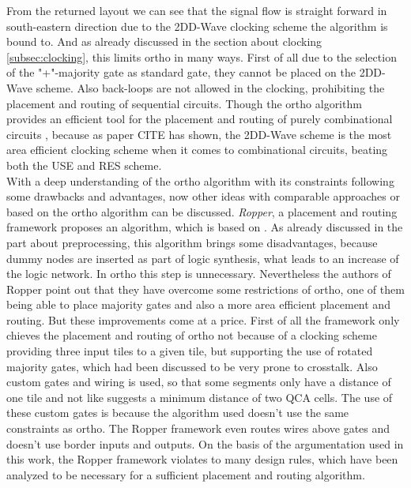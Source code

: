 From the returned layout we can see that the signal flow is straight forward in south-eastern direction due to the 2DD-Wave clocking scheme the algorithm is bound to. And as already discussed in the section about clocking \ref{subsec:clocking}, this limits ortho in many ways. First of all due to the selection of the "+"-majority gate as standard gate, they cannot be placed on the 2DD-Wave scheme. Also back-loops are not allowed in the clocking, prohibiting the placement and routing of sequential circuits. Though the ortho algorithm provides an efficient tool for the placement and routing of purely combinational circuits , because as paper CITE has shown, the 2DD-Wave scheme is the most area efficient clocking scheme when it comes to combinational circuits, beating both the USE and RES scheme.\\
With a deep understanding of the ortho algorithm with its constraints following some drawbacks and advantages, now other ideas with comparable approaches or based on the ortho algorithm can be discussed. \textit{Ropper}, a placement and routing framework \cite{ropper} proposes an algorithm, which is based on \cite{trindade2016placement}. As already discussed in the part about preprocessing, this algorithm brings some disadvantages, because dummy nodes are inserted as part of logic synthesis, what leads to an increase of the logic network. In ortho this step is unnecessary. Nevertheless the authors of Ropper point out that they have overcome some restrictions of ortho, one of them being able to place majority gates and also a more area efficient placement and routing. But these improvements come at a price. First of all the framework only chieves the placement and routing of ortho not because of a clocking scheme providing three input tiles to a given tile, but supporting the use of rotated majority gates, which had been discussed to be very prone to crosstalk. Also custom gates and wiring is used, so that some segments only have a distance of one tile and not like \cite{crosstalk} suggests a minimum distance of two QCA cells. The use of these custom gates is because the algorithm used doesn't use the same constraints as ortho. The Ropper framework even routes wires above gates and doesn't use border inputs and outputs. On the basis of the argumentation used in this work, the Ropper framework violates to many design rules, which have been analyzed to be necessary for a sufficient placement and routing algorithm.\\
